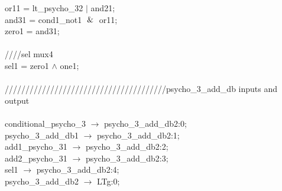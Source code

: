 {   \hspace*{2em}or11 = lt\_psycho\_32 $\vert$ and21; \\
   \hspace*{2em}and31 = cond1\_not1 $\And$ or11; \\
   \hspace*{2em}zero1 = and31; \\
   \\
   \hspace*{2em}////sel mux4 \\
   \hspace*{2em}sel1 = zero1 $\wedge$ one1; \\
   \\
   \hspace*{2em}///////////////////////////////////////psycho\_3\_add\_db inputs and output \\
   \\
   \hspace*{2em}conditional\_psycho\_3 $\rightarrow$ psycho\_3\_add\_db2:0; \\
   \hspace*{2em}psycho\_3\_add\_db1 $\rightarrow$ psycho\_3\_add\_db2:1; \\
   \hspace*{2em}add1\_psycho\_31 $\rightarrow$ psycho\_3\_add\_db2:2; \\
   \hspace*{2em}add2\_psycho\_31 $\rightarrow$ psycho\_3\_add\_db2:3; \\
   \hspace*{2em}sel1 $\rightarrow$ psycho\_3\_add\_db2:4; \\
   \hspace*{2em}psycho\_3\_add\_db2 $\rightarrow$ LTg:0; \\
   \\
} \\